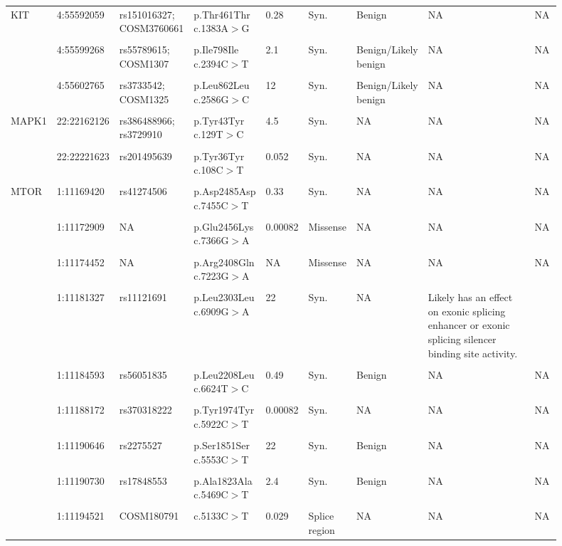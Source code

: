 \begin{landscape}
\begin{longtable}{p{0.07\linewidth}|p{0.09\linewidth}p{0.11\linewidth}p{0.1\linewidth}p{0.05\linewidth}p{0.065\linewidth}p{0.11\linewidth}p{0.25\linewidth}p{0.05\linewidth}}
		\\
		\\
    \hline
		KIT & 4:55592059 & rs151016327; COSM3760661 & p.Thr461Thr c.1383A$>$G & 0.28 & Syn. & Benign & NA & NA
		\\
		\\
		& 4:55599268 & rs55789615; COSM1307 & p.Ile798Ile c.2394C$>$T & 2.1 & Syn. & Benign/Likely benign & NA & NA
		\\
		\\
		& 4:55602765 & rs3733542; COSM1325 & p.Leu862Leu c.2586G$>$C & 12 & Syn. & Benign/Likely benign & NA & NA
		\\
		\\
		\hline
		MAPK1 & 22:22162126 & rs386488966; rs3729910 & p.Tyr43Tyr c.129T$>$C & 4.5 & Syn. & NA & NA & NA
		\\
		\\
		& 22:22221623 & rs201495639 & p.Tyr36Tyr c.108C$>$T & 0.052 & Syn. & NA & NA & NA
		\\
		\\
		\hline
		MTOR & 1:11169420 & rs41274506 & p.Asp2485Asp c.7455C$>$T & 0.33 & Syn. & NA & NA & NA
		\\
		\\
		& 1:11172909 & NA & p.Glu2456Lys c.7366G$>$A & 0.00082 & Missense & NA & NA & NA
		\\
		\\
		& 1:11174452 & NA & p.Arg2408Gln c.7223G$>$A & NA & Missense & NA & NA & NA
		\\
		\\
		& 1:11181327 & rs11121691 & p.Leu2303Leu c.6909G$>$A & 22 & Syn. & NA & Likely has an effect on exonic splicing enhancer or exonic splicing silencer binding site activity. & \cite{Zining2016}
		\\
		\\
		& 1:11184593 & rs56051835 & p.Leu2208Leu c.6624T$>$C & 0.49 & Syn. & Benign & NA & NA
		\\
		\\
		& 1:11188172 & rs370318222 & p.Tyr1974Tyr c.5922C$>$T & 0.00082 & Syn. & NA & NA & NA
		\\
		\\
		& 1:11190646 & rs2275527 & p.Ser1851Ser c.5553C$>$T & 22 & Syn. & Benign & NA & NA
		\\
		\\
		& 1:11190730 & rs17848553 & p.Ala1823Ala c.5469C$>$T & 2.4 & Syn. & Benign & NA & NA
		\\
		\\
		& 1:11194521 & COSM180791 & c.5133C$>$T & 0.029 & Splice region & NA & NA & NA

\end{longtable}
\end{landscape}
